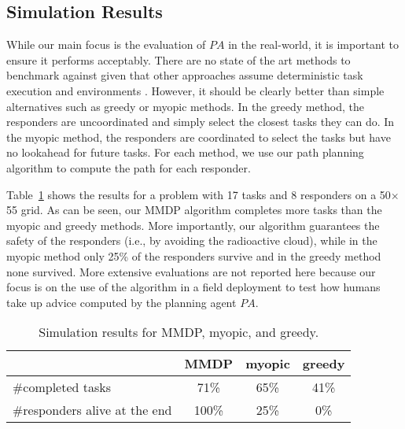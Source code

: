 \subsection{Simulation Results}
While our main focus  is the evaluation of $PA$ in the real-world, it is important  to ensure it
performs acceptably. There are no state of the art methods to benchmark against given that other approaches assume deterministic task execution and environments \cite{koes2006constraint,ramchurn:etal:2010b,Scerri2005,Chapman2009}. However, it should be clearly better than simple alternatives such as  greedy or myopic methods.  In
the greedy method, the responders are uncoordinated and simply select the
closest tasks they can do. In the myopic method, the responders are
coordinated to  select the tasks but have no lookahead for
future tasks. For each method, we use our
path planning algorithm to compute the path for each responder. 

Table~\ref{tab:simulation} shows the results for a problem with 17
tasks and 8 responders on a 50$\times$55 grid. As can be seen, our
MMDP algorithm completes more tasks than the myopic and greedy
methods. More importantly, our
algorithm guarantees the safety of the responders (i.e., by avoiding the radioactive cloud), while in the
myopic method  only 25\% of the responders survive and in the
greedy method none survived.
More extensive evaluations are not reported here because
our focus  is on the use of the algorithm in a field deployment
to test how humans take up advice computed by the planning agent
$PA$.\vspace{-2mm}
\begin{table}[htbp]
\begin{center}\small
  
  \begin{tabular}{l|c|c|c}
   & MMDP & myopic & greedy \\
  \hline
  \#completed tasks & 71\% & 65\% & 41\% \\
  \hline
  \#responders alive at the end & 100\% & 25\% & 0\% \\
  \end{tabular}
  \end{center}\caption{Simulation results for MMDP, myopic, and greedy.}
  \label{tab:simulation}\vspace{-4mm}
\end{table}
